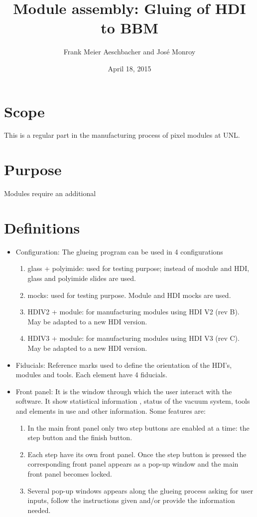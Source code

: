 \documentclass[12pt]{unlsilabsop}
\title{Module assembly: Gluing of HDI to BBM}
\date{April 18, 2015}
\author{Frank Meier Aeschbacher and José Monroy}
\begin{document}
\maketitle

\section{Scope}
This is a regular part in the manufacturing process of pixel modules at UNL.

\section{Purpose}
Modules require an additional

\section{Definitions}

\begin{itemize}
\item Configuration: The glueing program can be used in 4 configurations
  \begin{enumerate}
  \item glass + polyimide: used for testing purpose; instead of module and HDI, glass and polyimide slides are used.
  \item mocks: used for testing purpose. Module and HDI mocks are used.
  \item HDIV2 + module: for manufacturing modules using HDI V2 (rev B). May be adapted to a new HDI version.
  \item HDIV3 + module: for manufacturing modules using HDI V3 (rev C). May be adapted to a new HDI version.
  \end{enumerate}
\item Fiducials: Reference marks used to define the orientation of the HDI's, modules and tools. Each element have 4 fiducials. 
\item Front panel: It is the window through which the user interact with the software. It show statistical information , status of the vacuum system, tools and elements in use and other information. Some features are:
  \begin{enumerate}
    \item In the main front panel only two step buttons are enabled at a time: the step button and the finish button. 
    \item Each step have its own front panel. Once the step button is pressed the corresponding front panel appears as a pop-up window and the main front panel becomes locked.
    \item Several pop-up windows appears along the glueing process asking for user inputs, follow the instructions given and/or provide the information needed.
  \end{enumerate}
\end{itemize}
\end{document}
